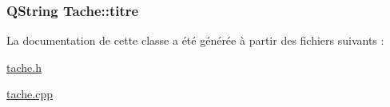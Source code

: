 \subsubsection[{titre}]{\setlength{\rightskip}{0pt plus 5cm}Q\+String Tache\+::titre\hspace{0.3cm}{\ttfamily [protected]}}\label{class_tache_a1d3d20046c0c4cc8482f71bb555b79cf}


La documentation de cette classe a été générée à partir des fichiers suivants \+:\begin{DoxyCompactItemize}
\item 
\hyperlink{tache_8h}{tache.\+h}\item 
\hyperlink{tache_8cpp}{tache.\+cpp}\end{DoxyCompactItemize}
